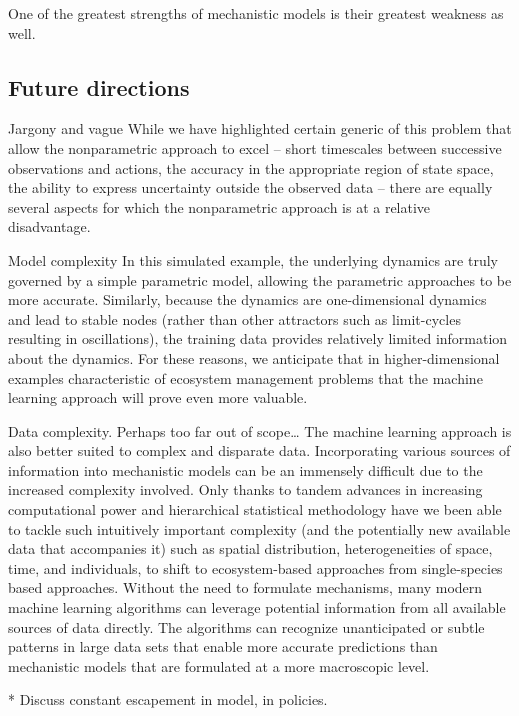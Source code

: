 \documentclass[author-year, review]{elsarticle} %
\begin{document}
One of the greatest strengths of mechanistic models is their greatest
weakness as well.

\subsection{Future directions}

 Jargony and vague While we have highlighted certain generic of this
problem that allow the nonparametric approach to excel -- short
timescales between successive observations and actions, the accuracy in
the appropriate region of state space, the ability to express
uncertainty outside the observed data -- there are equally several
aspects for which the nonparametric approach is at a relative
disadvantage.

 Model complexity In this simulated example, the underlying dynamics are
truly governed by a simple parametric model, allowing the parametric
approaches to be more accurate. Similarly, because the dynamics are
one-dimensional dynamics and lead to stable nodes (rather than other
attractors such as limit-cycles resulting in oscillations), the training
data provides relatively limited information about the dynamics. For
these reasons, we anticipate that in higher-dimensional examples
characteristic of ecosystem management problems that the machine
learning approach will prove even more valuable.

 Data complexity. Perhaps too far out of scope\ldots{} The machine
learning approach is also better suited to complex and disparate data.
Incorporating various sources of information into mechanistic models can
be an immensely difficult due to the increased complexity involved. Only
thanks to tandem advances in increasing computational power and
hierarchical statistical methodology have we been able to tackle such
intuitively important complexity (and the potentially new available data
that accompanies it) such as spatial distribution, heterogeneities of
space, time, and individuals, to shift to ecosystem-based approaches
from single-species based approaches. Without the need to formulate
mechanisms, many modern machine learning algorithms can leverage
potential information from all available sources of data directly. The
algorithms can recognize unanticipated or subtle patterns in large data
sets that enable more accurate predictions than mechanistic models that
are formulated at a more macroscopic level.

 * Discuss constant escapement in model, in policies.
\end{document}
